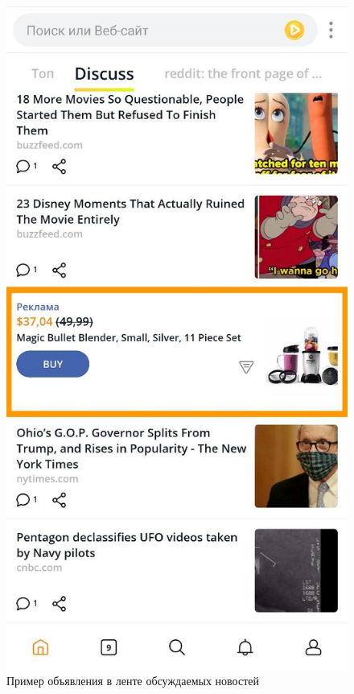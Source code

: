 \documentclass[specification,annotation,times]{itmo-student-thesis}
\begin{document}
\begin{figure}[h]
\caption{Пример объявления в ленте обсуждаемых новостей}
\includegraphics[height=0.29\paperheight]{ad-in-feed2}
\centering
\end{figure}
\end{document}
